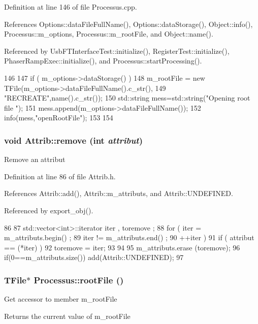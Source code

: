 Definition at line 146 of file Processus.cpp.

References Options::dataFileFullName(), Options::dataStorage(), Object::info(), Processus::m\_\-options, Processus::m\_\-rootFile, and Object::name().

Referenced by UsbFTInterfaceTest::initialize(), RegisterTest::initialize(), PhaserRampExec::initialize(), and Processus::startProcessing().


\begin{DoxyCode}
146                                {
147   if ( m_options->dataStorage() ){
148     m_rootFile = new TFile(m_options->dataFileFullName().c_str(),
149                            "RECREATE",name().c_str());
150         std::string mess=std::string("Opening root file ");
151         mess.append(m_options->dataFileFullName());
152         info(mess,"openRootFile");
153   }
154 }
\end{DoxyCode}
\hypertarget{classAttrib_a7d4ef7e32d93cb287792b87b857e79f3}{
\subsubsection[{remove}]{\setlength{\rightskip}{0pt plus 5cm}void Attrib::remove (int {\em attribut})}}
\label{classAttrib_a7d4ef7e32d93cb287792b87b857e79f3}
Remove an attribut 

Definition at line 86 of file Attrib.h.

References Attrib::add(), Attrib::m\_\-attributs, and Attrib::UNDEFINED.

Referenced by export\_\-obj().


\begin{DoxyCode}
86                                {
87     std::vector<int>::iterator iter , toremove ;
88     for ( iter  = m_attributs.begin() ;
89           iter != m_attributs.end()   ;
90           ++iter ) {
91       if ( attribut == (*iter) ) {
92         toremove = iter;
93       }
94     }
95     m_attributs.erase (toremove);
96     if(0==m_attributs.size()) add(Attrib::UNDEFINED);
97   }
\end{DoxyCode}
\hypertarget{classProcessus_a247e8c362ec08422cf53d08dd23b093c}{
\subsubsection[{rootFile}]{\setlength{\rightskip}{0pt plus 5cm}TFile$\ast$ Processus::rootFile ()}}
\label{classProcessus_a247e8c362ec08422cf53d08dd23b093c}
Get accessor to member m\_\-rootFile \begin{DoxyReturn}{Returns}
the current value of m\_\-rootFile 
\end{DoxyReturn}


